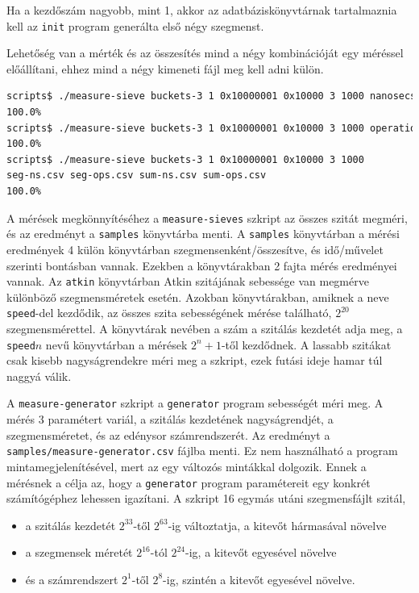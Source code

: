 Ha a kezdőszám nagyobb, mint 1, akkor az adatbáziskönyvtárnak tartalmaznia kell az \texttt{init} program generálta első négy szegmenst.

Lehetőség van a mérték és az összesítés mind a négy kombinációját egy méréssel előállítani, ehhez mind a négy kimeneti fájl meg kell adni külön.

\begin{lstlisting}[language=bash]
scripts$ ./measure-sieve buckets-3 1 0x10000001 0x10000 3 1000 nanosecs sum out1.csv
100.0%
scripts$ ./measure-sieve buckets-3 1 0x10000001 0x10000 3 1000 operations segment out2.csv
100.0%
scripts$ ./measure-sieve buckets-3 1 0x10000001 0x10000 3 1000
seg-ns.csv seg-ops.csv sum-ns.csv sum-ops.csv
100.0%
\end{lstlisting}

A mérések megkönnyítéséhez a \texttt{measure-sieves} szkript az összes szitát megméri, és az eredményt a \texttt{samples} könyvtárba menti.
A \texttt{samples} könyvtárban a mérési eredmények 4 külön könyvtárban szegmensenként/összesítve, és idő/művelet szerinti bontásban vannak.
Ezekben a könyvtárakban 2 fajta mérés eredményei vannak.
Az \texttt{atkin} könyvtárban Atkin szitájának sebessége van megmérve különböző szegmensméretek esetén.
Azokban könyvtárakban, amiknek a neve \texttt{speed}-del kezdődik, az összes szita sebességének mérése található, $2^{20}$ szegmensmérettel.
A könyvtárak nevében a szám a szitálás kezdetét adja meg, a \texttt{speed}$n$ nevű könyvtárban a mérések $2^n+1$-től kezdődnek.
A lassabb szitákat csak kisebb nagyságrendekre méri meg a szkript, ezek futási ideje hamar túl naggyá válik.

A \texttt{measure-generator} szkript a \texttt{generator} program sebességét méri meg.
A mérés 3 paramétert variál, a szitálás kezdetének nagyságrendjét, a szegmensméretet, és az edénysor számrendszerét.
Az eredményt a \texttt{samples/measure-generator.csv} fájlba menti.
Ez nem használható a program mintamegjelenítésével, mert az egy változós mintákkal dolgozik.
Ennek a mérésnek a célja az, hogy a \texttt{generator} program paramétereit egy konkrét számítógéphez lehessen igazítani.
A szkript 16 egymás utáni szegmensfájlt szitál,
\begin{itemize}
\item a szitálás kezdetét $2^{33}$-től $2^{63}$-ig változtatja, a kitevőt hármasával növelve
\item a szegmensek méretét $2^{16}$-tól $2^{24}$-ig, a kitevőt egyesével növelve
\item és a számrendszert $2^1$-től $2^8$-ig, szintén a kitevőt egyesével növelve.
\end{itemize}

